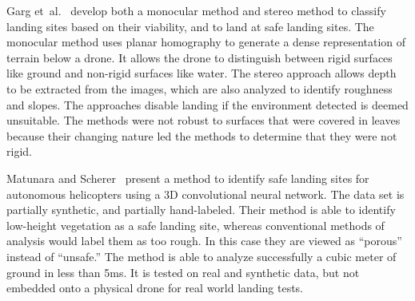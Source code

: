 Garg et~al.~\cite{landing_cues} develop both a monocular method and stereo method to classify landing sites based on their viability, and to land at safe landing sites. The monocular method uses planar homography to generate a dense representation of terrain below a drone. It allows the drone to distinguish between rigid surfaces like ground and non-rigid surfaces like water. The stereo approach allows depth to be extracted from the images, which are also analyzed to identify roughness and slopes. The approaches disable landing if the environment detected is deemed unsuitable. The methods were not robust to surfaces that were covered in leaves because their changing nature led the methods to determine that they were not rigid.

Matunara and Scherer~\cite{conv_3d_lidar_landing} present a method to identify safe landing sites for autonomous helicopters using a 3D convolutional neural network. The data set is partially synthetic, and partially hand-labeled. Their method is able to identify low-height vegetation as a safe landing site, whereas conventional methods of analysis would label them as too rough. In this case they are viewed as ``porous'' instead of ``unsafe.'' The method is able to analyze successfully a cubic meter of ground in less than 5ms. It is tested on real and synthetic data, but not embedded onto a physical drone for real world landing tests.
